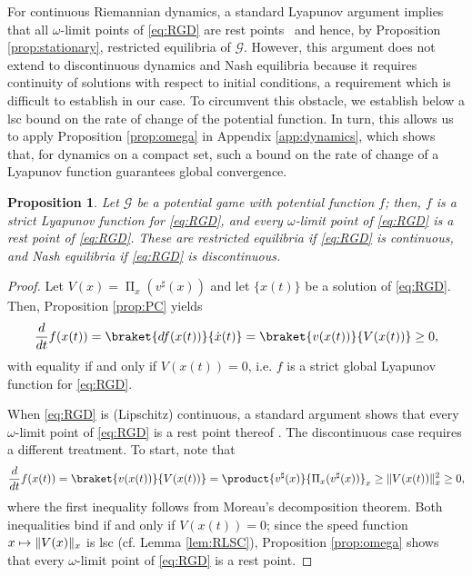 \documentclass[reqno]{amsart}
\DeclarePairedDelimiter{\norm}{\lVert}{\rVert}
\theoremstyle{plain}
\newtheorem{proposition}[theorem]{Proposition}
\theoremstyle{definition}
\theoremstyle{remark}
\numberwithin{equation}{section}
\numberwithin{theorem}{section}
\begin{document}
For continuous Riemannian dynamics, a standard Lyapunov argument implies that all $\omega$-limit points of \eqref{eq:RGD} are rest points \textendash\ and hence, by Proposition \ref{prop:stationary}, restricted equilibria of ${\mathcal{G}}$.
However, this argument does not extend to discontinuous dynamics and Nash equilibria because it requires continuity of solutions with respect to initial conditions, a requirement which is difficult to establish in our case.
To circumvent this obstacle, we establish below a \ac{lsc} bound on the rate of change of the potential function.
In turn, this allows us to apply Proposition \ref{prop:omega} in Appendix \ref{app:dynamics}, which shows that, for dynamics on a compact set, such a bound on the rate of change of a Lyapunov function guarantees global convergence.  

\begin{proposition}
\label{prop:potential}
Let ${\mathcal{G}}$ be a potential game with potential function ${f}$;
then, ${f}$ is a strict Lyapunov function for \eqref{eq:RGD}, and every $\omega$-limit point of \eqref{eq:RGD} is a rest point of \eqref{eq:RGD}.
These are restricted equilibria if \eqref{eq:RGD} is continuous, and Nash equilibria if \eqref{eq:RGD} is discontinuous.
\end{proposition}

\begin{proof}
Let  ${V}(x) = \operatorname{\Pi}_{x}({v}^{\sharp}(x))$ and let $\{x(t)\}$ be a solution of \eqref{eq:RGD}.
Then, Proposition \ref{prop:PC} yields
\begin{equation}
\label{eq:Lyapunov-pot}
\frac{d}{dt}{f}(x(t))
	= \braket{d{f}(x(t))}{\dot x(t)}
	= \braket{{v}(x(t))}{{V}( x(t))}
	\geq 0,
\end{equation}
with equality if and only if ${V}(x(t)) = 0$, i.e. ${f}$ is a strict global Lyapunov function for \eqref{eq:RGD}.

When \eqref{eq:RGD} is (Lipschitz) continuous, a standard argument shows that every $\omega$-limit point of \eqref{eq:RGD} is a rest point thereof \cite[see e.g.][Theorem 7.B.3]{San10}.
The discontinuous case requires a different treatment.
To start, note that
\begin{equation}
\frac{d}{dt}{f}(x(t))
	= \braket{{v}(x(t))}{{V}( x(t))}
	= \product{{v}^{\sharp}(x)}{\operatorname{\Pi}_{x}({v}^{\sharp}(x))}_x
	\geq \norm{{V}( x(t))}^2_x
	\geq 0,
\end{equation}
where the first inequality follows from Moreau's decomposition theorem.
Both inequalities bind if and only if ${V}(x(t)) = 0$;
since the speed function $x \mapsto \norm{{V}(x)}_x$ is \acl{lsc} (cf. Lemma \ref{lem:RLSC}),
Proposition \ref{prop:omega} shows that every $\omega$-limit point of \eqref{eq:RGD} is a rest point.
\end{proof}
\end{document}
